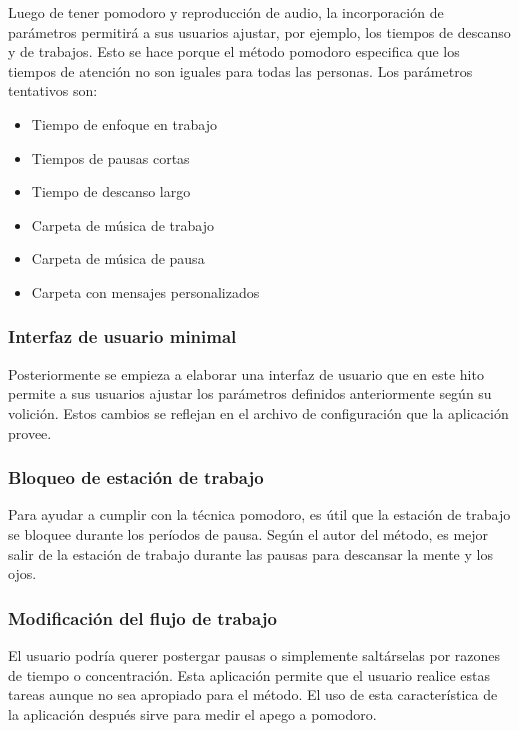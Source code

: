 \documentclass[12pt,letterpaper]{report}
\providecommand{\tightlist}{%
  \setlength{\itemsep}{0pt}\setlength{\parskip}{0pt}}
\begin{document}
Luego de tener pomodoro y reproducción de audio, la incorporación de parámetros permitirá a sus usuarios ajustar, por
ejemplo, los tiempos de descanso y de trabajos. Esto se hace porque el método pomodoro especifica que los tiempos de
atención no son iguales para todas las personas. Los parámetros tentativos son:

\begin{itemize}\tightlist{}
  \item Tiempo de enfoque en trabajo
  \item Tiempos de pausas cortas
  \item Tiempo de descanso largo
  \item Carpeta de música de trabajo
  \item Carpeta de música de pausa
  \item Carpeta con mensajes personalizados
\end{itemize}

\subsubsection{Interfaz de usuario minimal}

Posteriormente se empieza a elaborar una interfaz de usuario que en este hito permite a sus usuarios ajustar los
parámetros definidos anteriormente según su volición. Estos cambios se reflejan en el archivo de configuración que la
aplicación provee.

\subsubsection{Bloqueo de estación de trabajo}

Para ayudar a cumplir con la técnica pomodoro, es útil que la estación de trabajo se bloquee durante los períodos de
pausa. Según el autor del método, es mejor salir de la estación de trabajo durante las pausas para descansar la mente y
los ojos.

\subsubsection{Modificación del flujo de trabajo}

El usuario podría querer postergar pausas o simplemente saltárselas por razones de tiempo o concentración. Esta
aplicación permite que el usuario realice estas tareas aunque no sea apropiado para el método. El uso de esta
característica de la aplicación después sirve para medir el apego a pomodoro.
\end{document}
